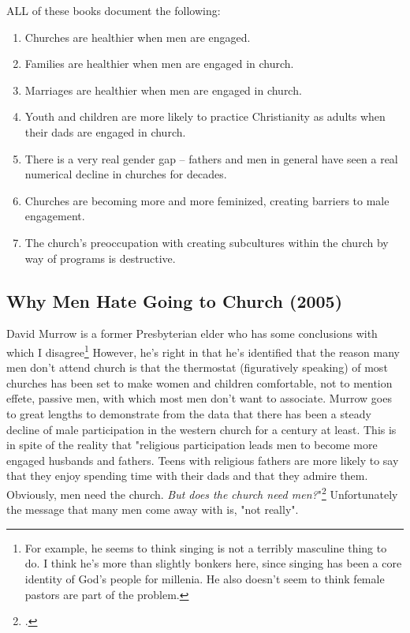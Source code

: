 \documentclass[justified, nobib]{tufte-handout}
\begin{document}
ALL of these books document the following:
\begin{enumerate}
  \item Churches are healthier when men are engaged.
  \item Families are healthier when men are engaged in church.
  \item Marriages are healthier when men are engaged in church.
  \item Youth and children are more likely to practice Christianity as adults when their dads are engaged in church.
  \item There is a very real gender gap -- fathers and men in general have seen a real numerical decline in churches for decades.
  \item Churches are becoming more and more feminized, creating barriers to male engagement.
  \item The church's preoccupation with creating subcultures within the church by way of programs is destructive.
\end{enumerate}

\subsection{Why Men Hate Going to Church (2005)}
David Murrow is a former Presbyterian elder who has some conclusions with which I disagree\footnote{For example, he seems to think singing is not a terribly masculine thing to do.  I think he's more than slightly bonkers here, since singing has been a core identity of God's people for millenia.  He also doesn't seem to think female pastors are part of the problem.}  However, he's right in that he's identified that the reason many men don't attend church is that the thermostat (figuratively speaking) of most churches has been set to make women and children comfortable, not to mention effete, passive men, with which most men don't want to associate. Murrow goes to great lengths to demonstrate from the data that there has been a steady decline of male participation in the western church for a century at least.  This is in spite of the reality that "religious participation leads men to become more engaged husbands and fathers.  Teens with religious fathers are more likely to say that they enjoy spending time with their dads and that they admire them.  Obviously, men need the church. \textit{But does the church need men?}"\footcite[p. 23, emphasis mine]{murrowmen}  Unfortunately the message that many men come away with is, "not really".
\end{document}
